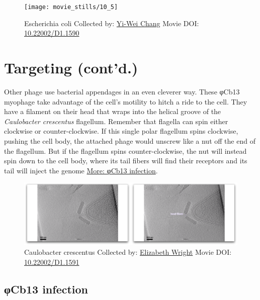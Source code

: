 \documentclass[]{tufte-book}
\begin{document}
\begin{figure}
\texttt{[image: movie\_stills/10\_5]} \caption[Escherichia coli Collected by:
\protect\hyperlink{yi-wei_chang}{Yi-Wei Chang} Movie DOI:
\href{https://doi.org/10.22002/D1.1590}{10.22002/D1.1590}]{Escherichia coli Collected by:
\protect\hyperlink{yi-wei_chang}{Yi-Wei Chang} Movie DOI:
\href{https://doi.org/10.22002/D1.1590}{10.22002/D1.1590}}\label{fig:10-5}
\end{figure}

\section{Targeting (cont'd.)}\label{targeting-contd.}

Other phage use bacterial appendages in an even cleverer way. These
φCb13 myophage take advantage of the cell's motility to hitch a ride to
the cell. They have a filament on their head that wraps into the helical
groove of the \emph{Caulobacter crescentus} flagellum. Remember that
flagella can spin either clockwise or counter-clockwise. If this single
polar flagellum spins clockwise, pushing the cell body, the attached
phage would unscrew like a nut off the end of the flagellum. But if the
flagellum spins counter-clockwise, the nut will instead spin down to the
cell body, where its tail fibers will find their receptors and its tail
will inject the genome \protect\hyperlink{ux3c6Cb13_infection}{More:
φCb13 infection}.





\begin{figure}
\includegraphics{movie_stills/10_6} \caption[Caulobacter crescentus Collected by:
\protect\hyperlink{elizabeth_wright}{Elizabeth Wright} Movie DOI:
\href{https://doi.org/10.22002/D1.1591}{10.22002/D1.1591}]{Caulobacter crescentus Collected by:
\protect\hyperlink{elizabeth_wright}{Elizabeth Wright} Movie DOI:
\href{https://doi.org/10.22002/D1.1591}{10.22002/D1.1591}}\label{fig:10-6}
\end{figure}

\hypertarget{ux3c6Cb13_infection}{\subsection{φCb13
infection}\label{ux3c6Cb13_infection}}
\end{document}
